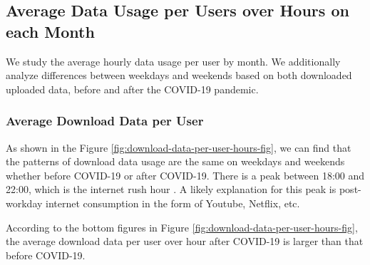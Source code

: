 \subsection{Average Data Usage per Users over Hours on each Month}
We study the average hourly data usage per user by month. We additionally analyze differences between weekdays and weekends based on both downloaded uploaded data, before and after the COVID-19 pandemic. 


\subsubsection{Average Download Data per User}
\label{sec:download-data-per-user-over-hours}


As shown in the Figure \ref{fig:download-data-per-user-hours-fig}, we can find that the patterns of download data usage are the same on weekdays and weekends whether before COVID-19 or after COVID-19. There is a peak between 18:00 and 22:00, which is the internet rush hour \cite{internetrushhour}. A likely explanation for this peak is post-workday internet consumption in the form of Youtube, Netflix, etc. 

According to the bottom figures in Figure \ref{fig:download-data-per-user-hours-fig}, the average download data per user over hour after COVID-19 is larger than that before COVID-19. 

